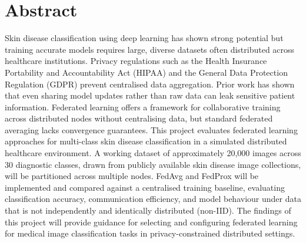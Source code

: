 \documentclass[12pt,openany,a4paper]{book}
\begin{document}
\chapter{Abstract}

Skin disease classification using deep learning has shown strong potential but training accurate models requires large, diverse datasets often distributed across healthcare institutions. Privacy regulations such as the Health Insurance Portability and Accountability Act (HIPAA) and the General Data Protection Regulation (GDPR) prevent centralised data aggregation. Prior work has shown that even sharing model updates rather than raw data can leak sensitive patient information. Federated learning offers a framework for collaborative training across distributed nodes without centralising data, but standard federated averaging lacks convergence guarantees. This project evaluates federated learning approaches for multi-class skin disease classification in a simulated distributed healthcare environment. A working dataset of approximately 20,000 images across 30 diagnostic classes, drawn from publicly available skin disease image collections, will be partitioned across multiple nodes. FedAvg and FedProx will be implemented and compared against a centralised training baseline, evaluating classification accuracy, communication efficiency, and model behaviour under data that is not independently and identically distributed (non-IID). The findings of this project will provide guidance for selecting and configuring federated learning for medical image classification tasks in privacy-constrained distributed settings.

\tableofcontents

\listoffigures
{}

\listoftables
{}

% 

\cleardoublepage

\mainmatter


%
%
%
%	
%	
\end{document}
